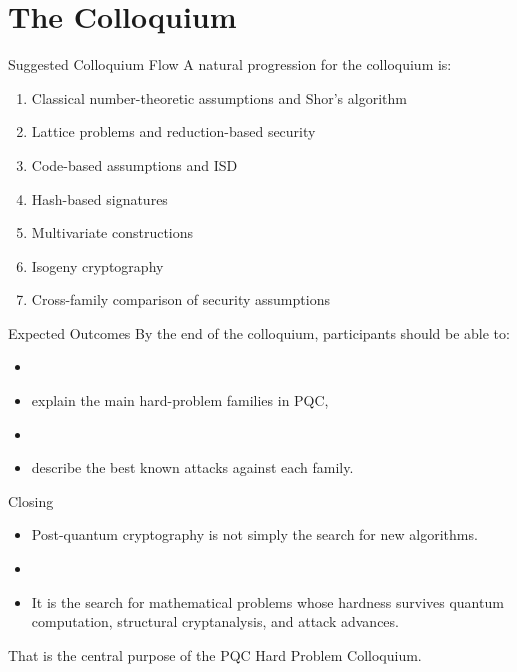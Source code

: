 \documentclass[serif, aspectratio=169]{beamer}
\begin{document}
\section{The Colloquium}
%
\begin{frame}{Suggested Colloquium Flow}
	A natural progression for the colloquium is:
	\begin{enumerate}
		\item Classical number-theoretic assumptions and Shor's algorithm
		\item Lattice problems and reduction-based security
		\item Code-based assumptions and ISD
		\item Hash-based signatures %
		\item Multivariate constructions %
		\item Isogeny cryptography %
		\item Cross-family comparison of security assumptions
	\end{enumerate}
\end{frame}

\begin{frame}{Expected Outcomes}
	By the end of the colloquium, participants should be able to:
	\begin{itemize}
		\item[]
		\item explain the main hard-problem families in PQC,
		\item[]
		\item describe the best known attacks against each family.
	\end{itemize}
\end{frame}

\begin{frame}{Closing}
		\begin{itemize}
		\item Post-quantum cryptography is not simply the search for new algorithms.
		\item[]
		\item It is the search for mathematical problems whose hardness survives quantum computation, structural cryptanalysis, and attack advances.
	\end{itemize}

	\vspace{0.75em}
	That is the central purpose of the PQC Hard Problem Colloquium.
\end{frame}
\end{document}
